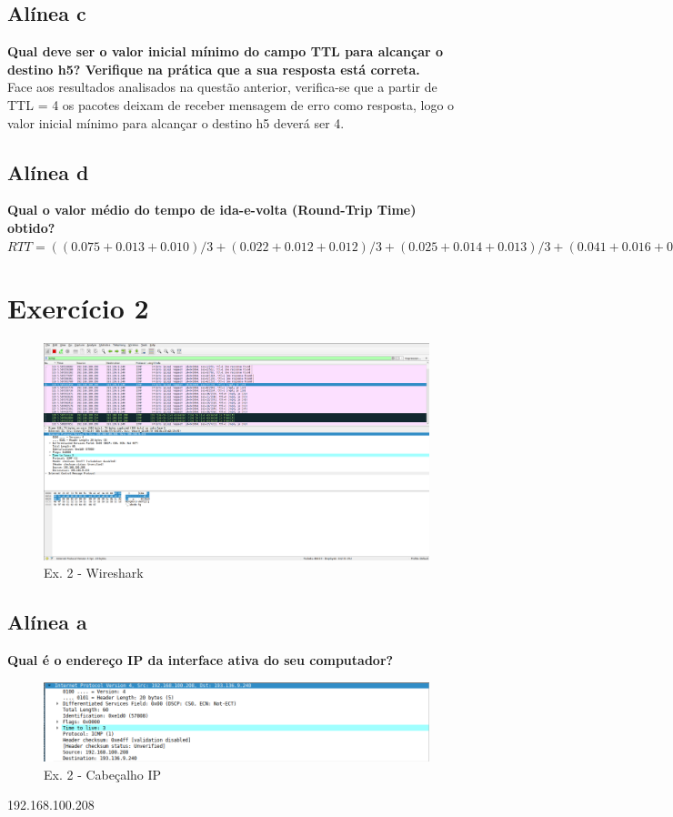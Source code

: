 \documentclass[a4paper]{report}
\begin{document}
\subsection{Alínea c}
\textbf{Qual deve ser o valor inicial mínimo do campo TTL para alcançar o
destino h5? Verifique na prática que a sua resposta está correta.}\\
Face aos resultados analisados na questão anterior, verifica-se que a partir de
TTL = 4 os pacotes deixam de receber mensagem de erro como resposta, logo o
valor inicial mínimo para alcançar o destino h5 deverá ser 4.

\subsection{Alínea d}
\textbf{Qual o valor médio do tempo de ida-e-volta (Round-Trip Time) obtido?}\\
\begin{math}
RTT = ((0.075 + 0.013 + 0.010) / 3 + (0.022 + 0.012 + 0.012) / 3 + (0.025 +
0.014 + 0.013) / 3 + (0.041 + 0.016 + 0.015) / 3) * 2 = 0.178
\end{math}

\section{Exercício 2}

\begin{figure}[H]
    \centering 
    \includegraphics[width=\textwidth]{images/wiresharkEx2.png}  
    \caption{Ex. 2 - Wireshark}
    \label{fig:wiresharkEx2}
\end{figure}

\subsection{Alínea a}
\textbf{Qual é o endereço IP da interface ativa do seu computador?}
\begin{figure}[H]
    \centering 
    \includegraphics[width=\textwidth]{images/ipEx2.png}
    \caption{Ex. 2 - Cabeçalho IP}
    \label{fig:ipEx2}
\end{figure}
192.168.100.208
\end{document}
